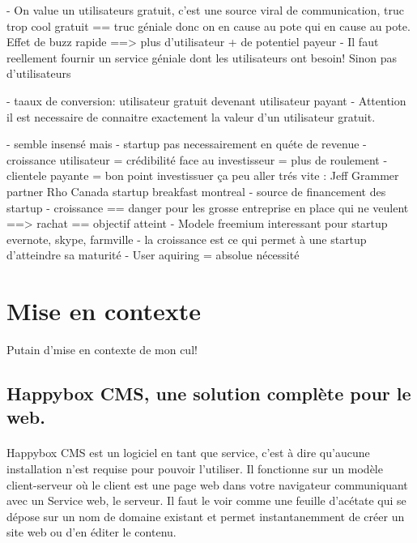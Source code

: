 \documentclass[11pt, a4paper ]{article}
\let\stdsection\section
\renewcommand\section{\newpage\stdsection}
\begin{document}
- On value un utilisateurs gratuit, c'est une source viral de communication, truc trop cool gratuit == truc géniale donc on en cause au pote qui en cause au pote. Effet de buzz rapide ==> plus d'utilisateur + de potentiel payeur
- Il faut reellement fournir un service géniale dont les utilisateurs ont besoin! Sinon pas d'utilisateurs

- taaux de conversion: utilisateur gratuit devenant utilisateur payant
- Attention il est necessaire de connaitre exactement la valeur d'un utilisateur gratuit.

- semble insensé mais
- startup pas necessairement en quéte de revenue
- croissance utilisateur = crédibilité face au investisseur = plus de roulement
- clientele payante = bon point investissuer ça peu aller trés vite : Jeff Grammer partner Rho Canada startup breakfast montreal
- source de financement des startup
- croissance == danger pour les grosse entreprise en place qui ne veulent ==> rachat == objectif atteint
- Modele freemium interessant pour startup evernote, skype, farmville
- la croissance est ce qui permet à une startup d'atteindre sa maturité
- User aquiring = absolue nécessité



		\section{Mise en contexte} %
Putain d'mise en contexte de mon cul!

			\subsection{Happybox CMS, une solution complète pour le web.}

\paragraph{}
Happybox CMS est un logiciel en tant que service, c'est à dire qu'aucune installation n'est requise pour pouvoir l'utiliser. Il fonctionne sur un modèle client-serveur où le client est une page web dans votre navigateur communiquant avec un Service web, le serveur. Il faut le voir comme une feuille d'acétate qui se dépose sur un nom de domaine existant et permet instantanemment de créer un site web ou d'en éditer le contenu.
\end{document}
